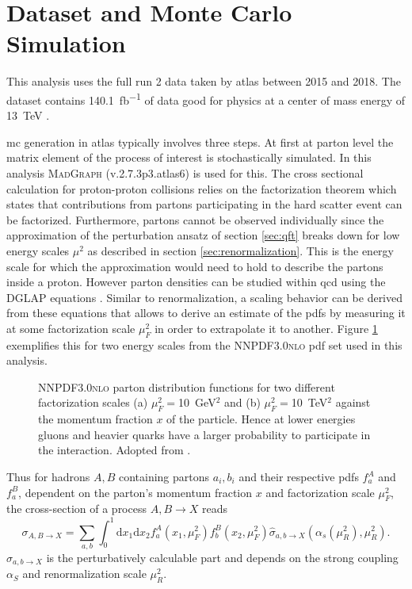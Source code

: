 \section{Dataset and Monte Carlo Simulation}\label{sec:mc_simulation}
This analysis uses the full run 2 data taken by \ac{atlas} between 2015 and 2018. The dataset contains \qty[]{140.1}{fb^{-1}} of data good for physics at a center of mass energy of \qty[]{13}{TeV} \citep{DAPR-2021-01}.

\ac{mc} generation in \ac{atlas} typically involves three steps. At first at parton level the matrix element of the process of interest is stochastically simulated. In this analysis \textsc{MadGraph} (v.2.7.3p3.atlas6) \citep{alwall2014automated} is used for this. The cross sectional calculation for proton-proton collisions relies on the factorization theorem \citep{halzen1984introductory} which states that contributions from partons participating in the hard scatter event can be factorized. Furthermore, partons cannot be observed individually since the approximation of the perturbation ansatz of section \ref{sec:qft} breaks down for low energy scales $\mu^2$ as described in section \ref{sec:renormalization}. This is the energy scale for which the approximation would need to hold to describe the partons inside a proton. However parton densities can be studied within \ac{qcd} using the DGLAP equations \citep{thomson2013modern}. Similar to renormalization, a scaling behavior can be derived from these equations that allows to derive an estimate of the \acp{pdf} by measuring it at some factorization scale $\mu_F^2$ in order to extrapolate it to another. Figure \ref{fig:pdf} exemplifies this for two energy scales from the \textsc{NNPDF3.0nlo} \ac{pdf} set used in this analysis.
\begin{figure}
    \centering
    \caption[]{\textsc{NNPDF3.0nlo} parton distribution functions for two different factorization scales (a) $\mu_F^2=$\qty{10}{GeV}$^2$ and (b) $\mu_F^2=$\qty{10}{TeV}$^2$ against the momentum fraction $x$ of the particle. Hence at lower energies gluons and heavier quarks have a larger probability to participate in the interaction. Adopted from \citep{PhysRevD.98.030001}.}
    \label{fig:pdf}
\end{figure}
Thus for hadrons $A,B$ containing partons $a_i,b_i$ and their respective \acp{pdf} $f_{a}^A$ and $f_{a}^B$, dependent on the parton's momentum fraction $x$ and factorization scale $\mu_F^2$, the cross-section of a process $A,B\rightarrow X$ reads
\begin{equation}
    \sigma_{A,B\rightarrow X} = \sum_{a,b} \int_0^1 \text{d}x_1\text{d}x_2 f_a^A(x_1,\mu_F^2) f_b^B(x_2,\mu_F^2) \hat{\sigma}_{a,b\rightarrow X}(\alpha_s(\mu_R^2),\mu_R^2).
\end{equation}
$\hat{\sigma}_{a,b\rightarrow X}$ is the perturbatively calculable part and depends on the strong coupling $\alpha_S$ and renormalization scale $\mu_R^2$.

